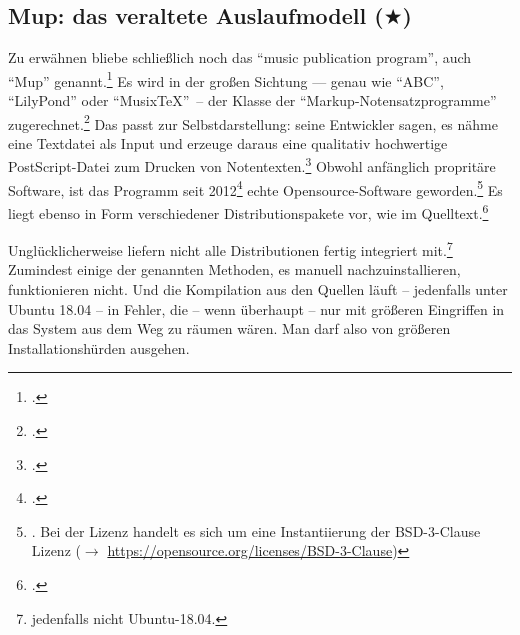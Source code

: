 %
%
%



\subsection{Mup: das veraltete Auslaufmodell ($\bigstar$)}

Zu erwähnen bliebe schließlich noch das \enquote{music publication program},
auch \enquote{Mup} genannt.\footcite[vgl.][\nopage wp]{Arkka2017a} Es wird in
der großen Sichtung --- genau wie \enquote{ABC}, \enquote{LilyPond} oder
\enquote{Musix\TeX}\ -- der Klasse der \enquote{Markup-Notensatzprogramme}
zugerechnet.\footcite[vgl.][\nopage wp]{WpedNotensatz2019a} Das passt zur
Selbstdarstellung: seine Entwickler sagen, es nähme eine Textdatei als Input
und erzeuge daraus eine qualitativ hochwertige PostScript-Datei zum Drucken von
Notentexten.\footcite[vgl.][\nopage wp]{Arkka2017a} Obwohl anfänglich propritäre
Software, ist das Programm seit 2012\footcite[vgl.][\nopage wp]{Arkka2017a}
echte Opensource-Software geworden.\footnote{\cite[vgl.][\nopage wp]{Arkka2017b}.
Bei der Lizenz handelt es sich um eine Instantiierung der BSD-3-Clause Lizenz
($\rightarrow$ \href{https://opensource.org/licenses/BSD-3-Clause}
{https://opensource.org/licenses/BSD-3-Clause})} Es liegt ebenso in Form
verschiedener Distributionspakete vor, wie im Quelltext.\footcite[vgl.][\nopage
wp]{Arkka2017c}

Unglücklicherweise liefern nicht alle Distributionen  fertig integriert
mit.\footnote{jedenfalls nicht Ubuntu-18.04.} Zumindest einige der genannten
Methoden, es manuell nachzuinstallieren, funktionieren nicht. Und die
Kompilation aus den Quellen läuft -- jedenfalls unter Ubuntu 18.04 -- in Fehler,
die -- wenn überhaupt -- nur mit größeren Eingriffen in das System aus dem Weg
zu räumen wären. Man darf also von größeren Installationshürden ausgehen.

